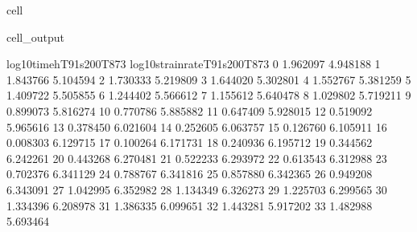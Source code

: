 \documentclass[letterpaper,10pt,english]{jupyterBook}
\begin{document}
\begin{sphinxuseclass}{cell}
\begin{sphinxVerbatimOutput}
\begin{sphinxuseclass}{cell_output}
\begin{sphinxVerbatim}[commandchars=\\\{\}]
					log10timeh\PYGZus{}T91s200T873  log10strainrate\PYGZus{}T91s200T873  \PYGZbs{}
					0                \PYGZhy{}1.962097                    \PYGZhy{}4.948188   
					1                \PYGZhy{}1.843766                    \PYGZhy{}5.104594   
					2                \PYGZhy{}1.730333                    \PYGZhy{}5.219809   
					3                \PYGZhy{}1.644020                    \PYGZhy{}5.302801   
					4                \PYGZhy{}1.552767                    \PYGZhy{}5.381259   
					5                \PYGZhy{}1.409722                    \PYGZhy{}5.505855   
					6                \PYGZhy{}1.244402                    \PYGZhy{}5.566612   
					7                \PYGZhy{}1.155612                    \PYGZhy{}5.640478   
					8                \PYGZhy{}1.029802                    \PYGZhy{}5.719211   
					9                \PYGZhy{}0.899073                    \PYGZhy{}5.816274   
					10               \PYGZhy{}0.770786                    \PYGZhy{}5.885882   
					11               \PYGZhy{}0.647409                    \PYGZhy{}5.928015   
					12               \PYGZhy{}0.519092                    \PYGZhy{}5.965616   
					13               \PYGZhy{}0.378450                    \PYGZhy{}6.021604   
					14               \PYGZhy{}0.252605                    \PYGZhy{}6.063757   
					15               \PYGZhy{}0.126760                    \PYGZhy{}6.105911   
					16               \PYGZhy{}0.008303                    \PYGZhy{}6.129715   
					17                0.100264                    \PYGZhy{}6.171731   
					18                0.240936                    \PYGZhy{}6.195712   
					19                0.344562                    \PYGZhy{}6.242261   
					20                0.443268                    \PYGZhy{}6.270481   
					21                0.522233                    \PYGZhy{}6.293972   
					22                0.613543                    \PYGZhy{}6.312988   
					23                0.702376                    \PYGZhy{}6.341129   
					24                0.788767                    \PYGZhy{}6.341816   
					25                0.857880                    \PYGZhy{}6.342365   
					26                0.949208                    \PYGZhy{}6.343091   
					27                1.042995                    \PYGZhy{}6.352982   
					28                1.134349                    \PYGZhy{}6.326273   
					29                1.225703                    \PYGZhy{}6.299565   
					30                1.334396                    \PYGZhy{}6.208978   
					31                1.386335                    \PYGZhy{}6.099651   
					32                1.443281                    \PYGZhy{}5.917202   
					33                1.482988                    \PYGZhy{}5.693464   

\end{sphinxVerbatim}
\end{sphinxuseclass}
\end{sphinxVerbatimOutput}
\end{sphinxuseclass}
\end{document}
